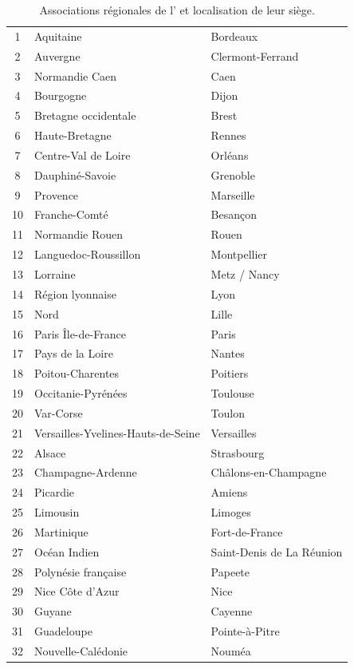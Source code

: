 \begin{table}[H]
\begin{tabularx}{\linewidth}{@{}
c
Y
Y
@{}}
1  & Aquitaine & Bordeaux \\
2  & Auvergne & Clermont-Ferrand \\
3  & Normandie Caen & Caen \\
4  & Bourgogne & Dijon \\
5  & Bretagne occidentale & Brest \\
6  & Haute-Bretagne & Rennes \\
7  & Centre-Val de Loire & Orléans \\
8  & Dauphiné-Savoie & Grenoble \\
9  & Provence & Marseille \\
10 & Franche-Comté & Besançon \\
11 & Normandie Rouen & Rouen \\
12 & Languedoc-Roussillon & Montpellier \\
13 & Lorraine & Metz / Nancy \\
14 & Région lyonnaise & Lyon \\
15 & Nord & Lille \\
16 & Paris Île-de-France & Paris \\
17 & Pays de la Loire & Nantes \\
18 & Poitou-Charentes & Poitiers \\
19 & Occitanie-Pyrénées & Toulouse \\
20 & Var-Corse & Toulon \\
21 & Versailles-Yvelines-Hauts-de-Seine & Versailles \\
22 & Alsace & Strasbourg \\
23 & Champagne-Ardenne & Châlons-en-Champagne \\
24 & Picardie & Amiens \\
25 & Limousin & Limoges \\
26 & Martinique & Fort-de-France \\
27 & Océan Indien & Saint-Denis de La Réunion \\
28 & Polynésie française & Papeete \\
29 & Nice Côte d'Azur & Nice \\
30 & Guyane & Cayenne \\
31 & Guadeloupe & Pointe-à-Pitre \\
32 & Nouvelle-Calédonie & Nouméa \\

\bottomrule
\end{tabularx}

\caption{Associations régionales de l'\UnionIHEDN{} et localisation de leur siège.}
\label{tab:associations_regionales_ihedn}

\end{table}